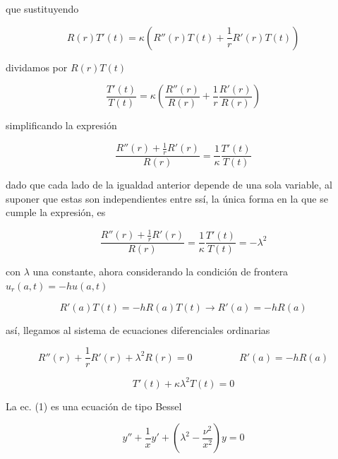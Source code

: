 \documentclass[12pt,a4paper]{article}
\begin{document}
\begin{enumerate}
    que sustituyendo
    
    \begin{equation*}
        R(r)T'(t)= \kappa (R''(r)T(t) + \frac{1}{r}R'(r)T(t))
    \end{equation*}
    
    dividamos por $R(r)T(t)$
    
    \begin{equation*}
        \frac{T'(t)}{T(t)}= \kappa\left(\frac{R''(r)}{R(r)} + \frac{1}{r} \frac{R'(r)}{R(r)}\right)
    \end{equation*}
    
    simplificando la expresión
    
    \begin{equation*}
        \frac{R''(r)+ \frac{1}{r} R'(r)}{R(r)}= \frac{1}{\kappa} \frac{T'(t)}{T(t)}
    \end{equation*}
    
    dado que cada lado de la igualdad anterior depende de una sola variable, al suponer que estas son independientes entre ssí, la única forma en la que se cumple la expresión, es 
    
    \begin{equation*}
        \frac{R''(r)+ \frac{1}{r} R'(r)}{R(r)}= \frac{1}{\kappa} \frac{T'(t)}{T(t)}= - \lambda^2
    \end{equation*}
    
    con $\lambda$ una constante, ahora considerando la condición de frontera $u_r(a,t)= -hu(a,t)$
    
    
\begin{equation*}
    R'(a)T(t)=-hR(a)T(t) \rightarrow R'(a)=-hR(a)
\end{equation*}

   así, llegamos al sistema de ecuaciones diferenciales ordinarias
   
   \begin{equation}
       R''(r)+\frac{1}{r}R'(r)+\lambda^2 R(r)= 0 \hspace{2cm} R'(a)=-hR(a)
   \end{equation}
   
   \begin{equation}
       T'(t)+\kappa\lambda^2T(t)=0
   \end{equation}
   
   La ec. (1) es una ecuación de tipo Bessel
   
   \begin{equation*}
       y'' + \frac{1}{x}y' + \left(\lambda^2 - \frac{\nu^2}{x^2}\right) y = 0
   \end{equation*}
   

\end{enumerate}
\end{document}
